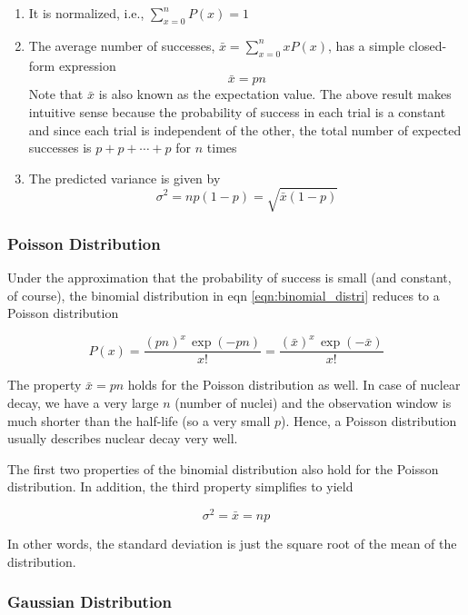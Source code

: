 \documentclass{article}
\begin{document}
\begin{enumerate}
    \item It is normalized, i.e., $\sum_{x=0}^{n} P(x) = 1$
    \item The average number of successes, $\bar{x} = \sum_{x=0}^{n} xP(x)$, has a simple closed-form expression 
    \[\bar{x} = pn\]
    Note that $\bar{x}$ is also known as the expectation value. The above result makes intuitive sense because the probability of success in each 
    trial is a constant and since each trial is independent of the other, the total number of expected successes is $p+p+ \cdots +p$ for $n$ times
    \item  The predicted variance is given by 
    \[\sigma^2  = np(1-p) = \sqrt{\bar{x}(1-p)}\]
    
\end{enumerate}



\subsubsection{Poisson Distribution}


Under the approximation that the probability of success is small (and constant, of course), the binomial distribution in eqn \ref{eqn:binomial_distri} reduces to a Poisson distribution

\begin{equation}\label{eqn:poisson_distri}
    P(x) = \frac{(pn)^x \, \exp (-pn)}{x!} = \frac{(\bar{x})^x \, \exp (-\bar{x})}{x!}
\end{equation}

The property $\bar{x} = pn$ holds for the Poisson distribution as well. In case of nuclear decay, we have a very large $n$ (number of nuclei)
and the observation window is much shorter than the half-life (so a very small $p$). Hence, a Poisson distribution usually describes nuclear decay very well.

The first two properties of the binomial distribution also hold for the Poisson distribution. In addition, the third property simplifies to yield

\[\sigma^2 = \bar{x} = np\]

In other words, the standard deviation is just the square root of the mean of the distribution.



\subsubsection{Gaussian Distribution}
\end{document}
